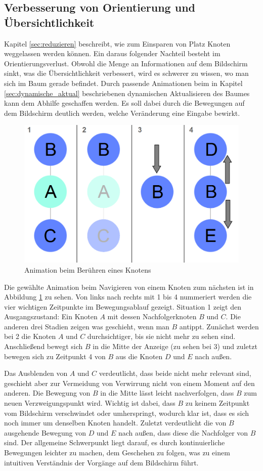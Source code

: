 \subsection{Verbesserung von Orientierung und Übersichtlichkeit}
Kapitel \ref{sec:reduzieren} beschreibt, wie zum Einsparen von Platz Knoten weggelassen werden können. Ein daraus folgender Nachteil besteht im Orientierungsverlust. Obwohl die Menge an Informationen auf dem Bildschirm sinkt, was die Übersichtlichkeit verbessert, wird es schwerer zu wissen, wo man sich im Baum gerade befindet. Durch passende Animationen beim in Kapitel \ref{sec:dynamische_aktual} beschriebenen dynamischen Aktualisieren des Baumes kann dem Abhilfe geschaffen werden. Es soll dabei durch die Bewegungen auf dem Bildschirm deutlich werden, welche Veränderung eine Eingabe bewirkt.
\begin{figure}
	\centering
	\includegraphics[width=.9\linewidth]{../screenshots/animation.png}
	\caption{Animation beim Berühren eines Knotens}
	\label{abb:animation}
\end{figure}
Die gewählte Animation beim Navigieren von einem Knoten zum nächsten ist in Abbildung \ref{abb:animation} zu sehen. Von links nach rechts mit 1 bis 4 nummeriert werden die vier wichtigen Zeitpunkte im Bewegungsablauf gezeigt. Situation 1 zeigt den Ausgangszustand: Ein Knoten $A$ mit dessen Nachfolgerknoten $B$ und $C$. Die anderen drei Stadien zeigen was geschieht, wenn man $B$ antippt. Zunächst werden bei 2 die Knoten $A$ und $C$ durchsichtiger, bis sie nicht mehr zu sehen sind. Anschließend bewegt sich $B$ in die Mitte der Anzeige (zu sehen bei 3) und zuletzt bewegen sich zu Zeitpunkt 4 von $B$ aus die Knoten $D$ und $E$ nach außen.

Das Ausblenden von $A$ und $C$ verdeutlicht, dass beide nicht mehr relevant sind, geschieht aber zur Vermeidung von Verwirrung nicht von einem Moment auf den anderen. Die Bewegung von $B$ in die Mitte lässt leicht nachverfolgen, dass $B$ zum neuen Verzweigungspunkt wird. Wichtig ist dabei, dass $B$ zu keinem Zeitpunkt vom Bildschirm verschwindet oder umherspringt, wodurch klar ist, dass es sich noch immer um denselben Knoten handelt. Zuletzt verdeutlicht die von $B$ ausgehende Bewegung von $D$ und $E$ nach außen, dass diese die Nachfolger von $B$ sind. Der allgemeine Schwerpunkt liegt darauf, es durch kontinuierliche Bewegungen leichter zu machen, dem Geschehen zu folgen, was zu einem intuitiven Verständnis der Vorgänge auf dem Bildschirm führt.

